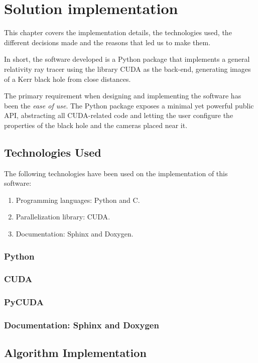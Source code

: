 \chapter{Solution implementation}

This chapter covers the implementation details, the technologies used, the different decisions made and the reasons that led us to make them.

In short, the software developed is a Python package that implements a general relativity ray tracer using the library \ac{CUDA} as the back-end, generating images of a Kerr black hole from close distances.

The primary requirement when designing and implementing the software has been the \emph{ease of use}. The Python package exposes a minimal yet powerful public \ac{API}, abstracting all \ac{CUDA}-related code and letting the user configure the properties of the black hole and the cameras placed near it.

\section{Technologies Used}

The following technologies have been used on the implementation of this software:
\begin{enumerate}
	\item Programming languages: Python and C.
	\item Parallelization library: \ac{CUDA}.
	\item Documentation: Sphinx and Doxygen.
\end{enumerate}

\subsection{Python}
\subsection{CUDA}
\subsection{PyCUDA}
\subsection{Documentation: Sphinx and Doxygen}

\section{Algorithm Implementation}
